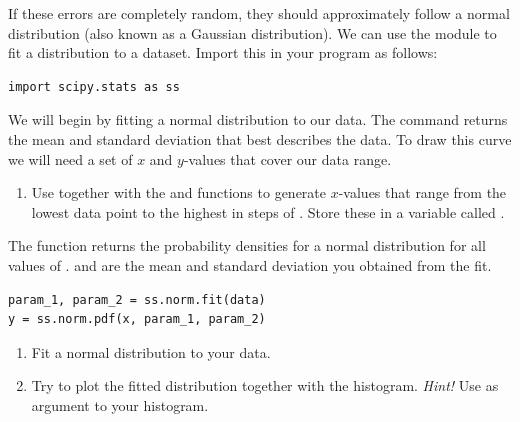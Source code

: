 \documentclass{article}
\begin{document}
If these errors are completely random, they should approximately follow a normal distribution (also known as a Gaussian distribution).
We can use the module  to fit a distribution to a dataset.
Import this in your program as follows:

\begin{lstlisting}
import scipy.stats as ss
\end{lstlisting}

We will begin by fitting a normal distribution to our data.
The command  returns the mean and standard deviation that best describes the data.
To draw this curve we will need a set of $x$ and $y$-values that cover our data range.

\begin{enumerate}[resume]

    \item Use  together with the  and  functions to generate $x$-values that range from the lowest data point to the highest in steps of . Store these in a variable called .

\end{enumerate}

The function  returns the probability densities for a normal distribution for all values of .
 and  are the mean and standard deviation you obtained from the fit.


\begin{lstlisting}
param_1, param_2 = ss.norm.fit(data)
y = ss.norm.pdf(x, param_1, param_2)
\end{lstlisting}


\begin{enumerate}[resume]

    \item Fit a normal distribution to your data.

    \item Try to plot the fitted distribution together with the histogram. \emph{Hint!} Use  as argument to your histogram.


\end{enumerate}
\end{document}
